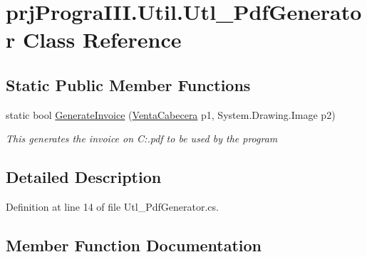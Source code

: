 \hypertarget{classprj_progra_i_i_i_1_1_util_1_1_utl___pdf_generator}{}\section{prj\+Progra\+I\+I\+I.\+Util.\+Utl\+\_\+\+Pdf\+Generator Class Reference}
\label{classprj_progra_i_i_i_1_1_util_1_1_utl___pdf_generator}
\subsection*{Static Public Member Functions}
\begin{DoxyCompactItemize}
\item 
static bool \hyperlink{classprj_progra_i_i_i_1_1_util_1_1_utl___pdf_generator_ab6b2282b30233a0f0292378aa9c5779d}{Generate\+Invoice} (\hyperlink{classprj_progra_i_i_i_1_1_layer_1_1_entities_1_1_venta_cabecera}{Venta\+Cabecera} p1, System.\+Drawing.\+Image p2)
\begin{DoxyCompactList}\small\item\em This generates the invoice on C\+:.pdf to be used by the program \end{DoxyCompactList}\end{DoxyCompactItemize}


\subsection{Detailed Description}


Definition at line 14 of file Utl\+\_\+\+Pdf\+Generator.\+cs.



\subsection{Member Function Documentation}
\hypertarget{classprj_progra_i_i_i_1_1_util_1_1_utl___pdf_generator_ab6b2282b30233a0f0292378aa9c5779d}{}\label{classprj_progra_i_i_i_1_1_util_1_1_utl___pdf_generator_ab6b2282b30233a0f0292378aa9c5779d} 
